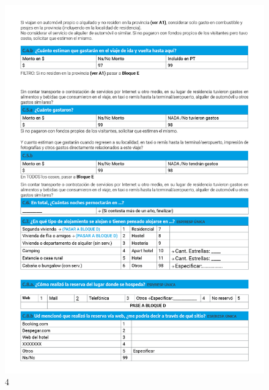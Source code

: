 \documentclass[
]{book}
\begin{document}
\begin{figure}
\includegraphics[width=17.22in]{imagenes/graf04} \caption{4}\label{fig:004}
\end{figure}
\end{document}

